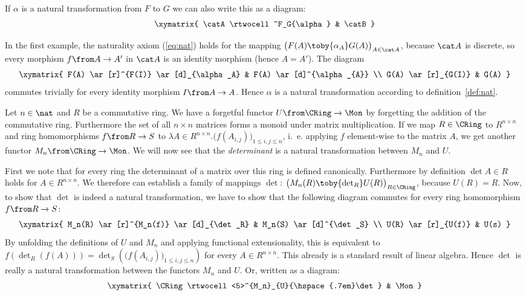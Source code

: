 If $\alpha$ is a natural transformation from $F$ to $G$ we can also write this as a diagram:
\[\xymatrix{
  \catA \rtwocell^F_G{\alpha} & \catB
}\]

\begin{exmp}
  In the first example, the naturality axiom (\ref{eq:nat}) holds for the mapping
  $\bigl(F(A)\toby{\alpha_A}G(A)\bigr)_{A\in\catA}$,
  because $\catA$ is discrete, so every morphism $f \from A \to A'$ in $\catA$ is an identity morphism (hence $A=A'$). The diagram
  \[
    \xymatrix{
      F(A) \ar[r]^{F(I)} \ar[d]_{\alpha_A} & F(A) \ar[d]^{\alpha_{A}} \\
      G(A) \ar[r]_{G(I)} & G(A)
  }\]
  commutes trivially for every identity morphism $I \from A \to A$. Hence $\alpha$ is a natural transformation according to definition~\ref{def:nat}.
\end{exmp}

\begin{exmp}
  Let $n\in\nat$ and $R$ be a commutative ring.
  We have a forgetful functor $U \from \CRing \to \Mon$ by forgetting the addition of the commutative ring.
  Furthermore the set of all $n \times n$ matrices forms a monoid under matrix multiplication.
  If we map $R \in \CRing$ to $R^{n \times n}$ and ring homomorphisms $f \from R \to S$ to
  $\lambda A \in R^{n \times n}. \bigl( f(A_{i,j}) \bigr)_{1 \le i, j \le n}$,
  i.~e. applying $f$ element-wise to the matrix $A$, we get another functor $M_n \from \CRing \to \Mon$.
  We will now see that the \emph{determinant} is a natural transformation between $M_n$ and $U$.

  First we note that for every ring the determinant of a matrix over this ring is defined canonically.
  Furthermore by definition $\det A \in R$ holds for $A \in R^{n \times n}$.
  We therefore can establish a family of mappings $\det$:
  $\bigl(M_n(R)\toby{\det_R}U(R)\bigr)_{R\in\CRing}$, because $U(R) = R$.
  Now, to show that $\det$ is indeed a natural transformation, we have to show that the following diagram commutes for every ring homomorphism $f \from R \to S$:
  \[\xymatrix{
    M_n(R) \ar[r]^{M_n(f)} \ar[d]_{\det_R} & M_n(S) \ar[d]^{\det_S} \\
    U(R) \ar[r]_{U(f)} & U(s)
  }\]
  By unfolding the definitions of $U$ and $M_n$ and applying functional extensionality, this is equivalent to
  $f(\det_R(f(A))) = \det_S (\bigl( f(A_{i,j}) \bigr)_{1 \le i, j \le n})$
  for every $A \in R^{n \times n}$.
  This already is a standard result of linear algebra.
  Hence $\det$ is really a natural transformation between the functors $M_n$ and $U$. Or, written as a diagram:
  \[\xymatrix{
    \CRing \rtwocell<5>^{M_n}_{U}{\hspace{.7em}\det} & \Mon
  }\]
\end{exmp}

